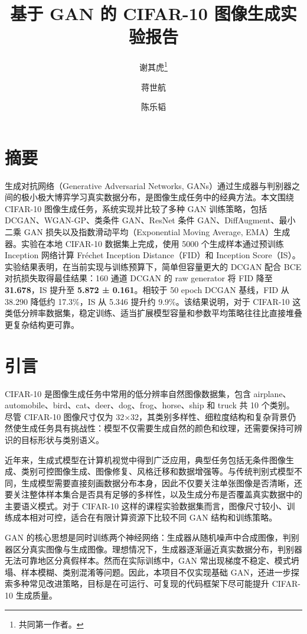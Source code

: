 \documentclass[UTF8,a4paper,12pt]{ctexart}
\title{基于 GAN 的 CIFAR-10 图像生成实验报告}
\author{
谢其虎\thanks{共同第一作者。}
\and
蒋世航\footnotemark[1]
\and
陈乐韬\footnotemark[1]
}
\date{}
\begin{document}
\maketitle


\section{摘要}

生成对抗网络（Generative Adversarial Networks, GANs）通过生成器与判别器之间的极小极大博弈学习真实数据分布，是图像生成任务中的经典方法。本文围绕 CIFAR-10 图像生成任务，系统实现并比较了多种 GAN 训练策略，包括 DCGAN、WGAN-GP、类条件 GAN、ResNet 条件 GAN、DiffAugment、最小二乘 GAN 损失以及指数滑动平均（Exponential Moving Average, EMA）生成器。实验在本地 CIFAR-10 数据集上完成，使用 5000 个生成样本通过预训练 Inception 网络计算 Fréchet Inception Distance（FID）和 Inception Score（IS）。实验结果表明，在当前实现与训练预算下，简单但容量更大的 DCGAN 配合 BCE 对抗损失取得最佳结果：160 通道 DCGAN 的 raw generator 将 FID 降至 \textbf{31.678}，IS 提升至 \textbf{5.872 ± 0.161}。相较于 50 epoch DCGAN 基线，FID 从 38.290 降低约 17.3\%，IS 从 5.346 提升约 9.9\%。该结果说明，对于 CIFAR-10 这类低分辨率数据集，稳定训练、适当扩展模型容量和参数平均策略往往比直接堆叠更复杂结构更可靠。


\section{引言}

CIFAR-10 是图像生成任务中常用的低分辨率自然图像数据集，包含 airplane、automobile、bird、cat、deer、dog、frog、horse、ship 和 truck 共 10 个类别。尽管 CIFAR-10 图像尺寸仅为 32×32，其类别多样性、细粒度结构和复杂背景仍然使生成任务具有挑战性：模型不仅需要生成自然的颜色和纹理，还需要保持可辨识的目标形状与类别语义。


近年来，生成式模型在计算机视觉中得到广泛应用，典型任务包括无条件图像生成、类别可控图像生成、图像修复、风格迁移和数据增强等。与传统判别式模型不同，生成模型需要直接刻画数据分布本身，因此不仅要关注单张图像是否清晰，还要关注整体样本集合是否具有足够的多样性，以及生成分布是否覆盖真实数据中的主要语义模式。对于 CIFAR-10 这样的课程实验数据集而言，图像尺寸较小、训练成本相对可控，适合在有限计算资源下比较不同 GAN 结构和训练策略。


GAN 的核心思想是同时训练两个神经网络：生成器从随机噪声中合成图像，判别器区分真实图像与生成图像。理想情况下，生成器逐渐逼近真实数据分布，判别器无法可靠地区分真假样本。然而在实际训练中，GAN 常出现梯度不稳定、模式坍塌、样本模糊、类别混淆等问题。因此，本项目不仅实现基础 GAN，还进一步探索多种常见改进策略，目标是在可运行、可复现的代码框架下尽可能提升 CIFAR-10 生成质量。
\end{document}
